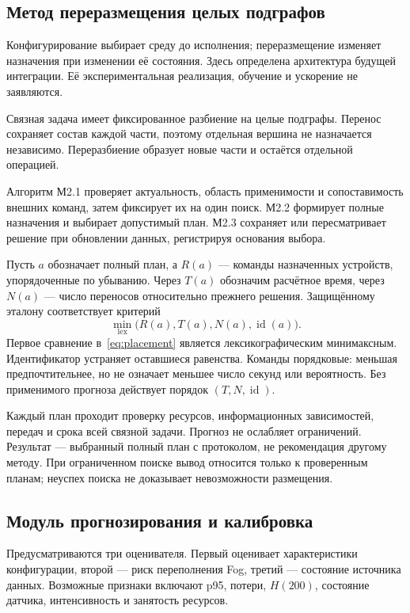 \subsection{Метод переразмещения целых подграфов}
Конфигурирование выбирает среду до исполнения; переразмещение изменяет назначения при изменении её состояния. Здесь определена архитектура будущей интеграции. Её экспериментальная реализация, обучение и ускорение не заявляются.

Связная задача имеет фиксированное разбиение на целые подграфы. Перенос сохраняет состав каждой части, поэтому отдельная вершина не назначается независимо. Переразбиение образует новые части и остаётся отдельной операцией.

Алгоритм М2.1 проверяет актуальность, область применимости и сопоставимость внешних команд, затем фиксирует их на один поиск. М2.2 формирует полные назначения и выбирает допустимый план. М2.3 сохраняет или пересматривает решение при обновлении данных, регистрируя основания выбора.

Пусть $a$ обозначает полный план, а $R(a)$ --- команды назначенных устройств, упорядоченные по убыванию. Через $T(a)$ обозначим расчётное время, через $N(a)$ --- число переносов относительно прежнего решения. Защищённому эталону соответствует критерий
\begin{equation}\label{eq:placement}
 \min_{\mathrm{lex}}\bigl(R(a),T(a),N(a),\operatorname{id}(a)\bigr).
\end{equation}
Первое сравнение в~\eqref{eq:placement} является лексикографическим минимаксным. Идентификатор устраняет оставшиеся равенства. Команды порядковые: меньшая предпочтительнее, но не означает меньшее число секунд или вероятность. Без применимого прогноза действует порядок $(T,N,\operatorname{id})$.

Каждый план проходит проверку ресурсов, информационных зависимостей, передач и срока всей связной задачи. Прогноз не ослабляет ограничений. Результат --- выбранный полный план с протоколом, не рекомендация другому методу. При ограниченном поиске вывод относится только к проверенным планам; неуспех поиска не доказывает невозможности размещения.

\subsection{Модуль прогнозирования и калибровка}
Предусматриваются три оценивателя. Первый оценивает характеристики конфигурации, второй --- риск переполнения Fog, третий --- состояние источника данных. Возможные признаки включают p95, потери, $H(200)$, состояние датчика, интенсивность и занятость ресурсов.

